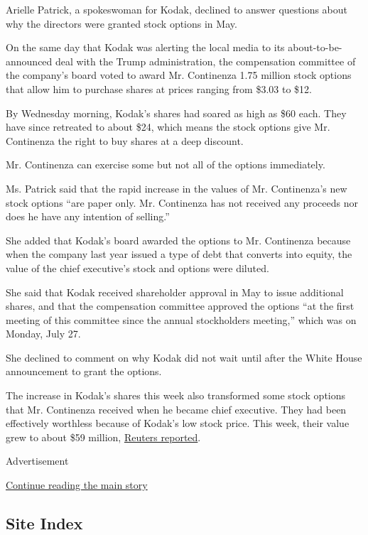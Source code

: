 Arielle Patrick, a spokeswoman for Kodak, declined to answer questions
about why the directors were granted stock options in May.

On the same day that Kodak was alerting the local media to its
about-to-be-announced deal with the Trump administration, the
compensation committee of the company's board voted to award Mr.
Continenza 1.75 million stock options that allow him to purchase shares
at prices ranging from \$3.03 to \$12.

By Wednesday morning, Kodak's shares had soared as high as \$60 each.
They have since retreated to about \$24, which means the stock options
give Mr. Continenza the right to buy shares at a deep discount.

Mr. Continenza can exercise some but not all of the options immediately.

Ms. Patrick said that the rapid increase in the values of Mr.
Continenza's new stock options ``are paper only. Mr. Continenza has not
received any proceeds nor does he have any intention of selling.''

She added that Kodak's board awarded the options to Mr. Continenza
because when the company last year issued a type of debt that converts
into equity, the value of the chief executive's stock and options were
diluted.

She said that Kodak received shareholder approval in May to issue
additional shares, and that the compensation committee approved the
options ``at the first meeting of this committee since the annual
stockholders meeting,'' which was on Monday, July 27.

She declined to comment on why Kodak did not wait until after the White
House announcement to grant the options.

The increase in Kodak's shares this week also transformed some stock
options that Mr. Continenza received when he became chief executive.
They had been effectively worthless because of Kodak's low stock price.
This week, their value grew to about \$59 million,
\href{https://www.nytimes.com/reuters/2020/07/29/business/29reuters-eastman-kodak-ceo.html}{Reuters
reported}.

Advertisement

\protect\hyperlink{after-bottom}{Continue reading the main story}

\hypertarget{site-index}{%
\subsection{Site Index}\label{site-index}}

